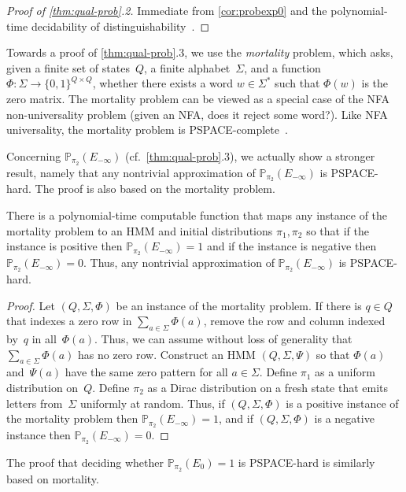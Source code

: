 \documentclass[a4paper,UKenglish,cleveref, autoref,mathscr]{lipics-v2019}
\newcommand{\PP}{\mathbb{P}}
\newcommand{\1}{\mathbbm{1}}
\begin{document}
\begin{proof}[Proof of \cref{thm:qual-prob}.2]
Immediate from \cref{cor:probexp0} and the polynomial-time decidability of distinguishability~\cite{kief14}.
\end{proof}

Towards a proof of \cref{thm:qual-prob}.3, we use the \emph{mortality} problem, which asks, given a finite set of states~$Q$, a finite alphabet~$\Sigma$, and a function $\Phi : \Sigma \to \{0,1\}^{Q \times Q}$, whether there exists a word $w \in \Sigma^*$ such that $\Phi(w)$ is the zero matrix.
The mortality problem can be viewed as a special case of the NFA non-universality problem (given an NFA, does it reject some word?).
Like NFA universality, the mortality problem is PSPACE-complete~\cite{karasha09}.

Concerning $\PP_{\pi_2}(E_{-\infty})$ (cf.\ \cref{thm:qual-prob}.3), we actually show a stronger result, namely that any nontrivial approximation of $\PP_{\pi_2}(E_{-\infty})$ is PSPACE-hard.
The proof is also based on the mortality problem.
\begin{proposition} \label{prop:nontrivial-approx}
There is a polynomial-time computable function that maps any instance of the mortality problem to an HMM and initial distributions $\pi_1, \pi_2$ so that if the instance is positive then $\PP_{\pi_2}(E_{-\infty})=1$ and if the instance is negative then $\PP_{\pi_2}(E_{-\infty})=0$.
Thus, any nontrivial approximation of $\PP_{\pi_2}(E_{-\infty})$ is PSPACE-hard.
\end{proposition}
\begin{proof}
Let $(Q,\Sigma,\Phi)$ be an instance of the mortality problem.
If there is $q \in Q$ that indexes a zero row in $\sum_{a \in \Sigma} \Phi(a)$, remove the row and column indexed by~$q$ in all~$\Phi(a)$.
Thus, we can assume without loss of generality that $\sum_{a \in \Sigma} \Phi(a)$ has no zero row.
Construct an HMM $(Q,\Sigma,\Psi)$ so that $\Phi(a)$ and~$\Psi(a)$ have the same zero pattern for all $a \in \Sigma$.
Define $\pi_1$ as a uniform distribution on~$Q$.
Define $\pi_2$ as a Dirac distribution on a fresh state that emits letters from~$\Sigma$ uniformly at random.
Thus, if $(Q,\Sigma,\Phi)$ is a positive instance of the mortality problem then $\PP_{\pi_2}(E_{-\infty})=1$, and if $(Q,\Sigma,\Phi)$ is a negative instance then $\PP_{\pi_2}(E_{-\infty})=0$.
\end{proof}

The proof that deciding whether $\PP_{\pi_2}(E_0) = 1$ is PSPACE-hard is similarly based on mortality.
\end{document}
